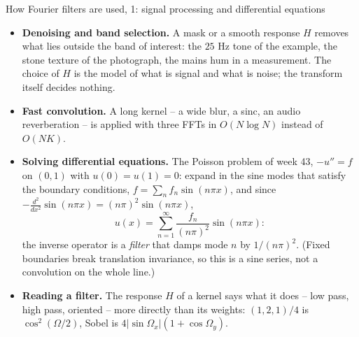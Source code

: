 \documentclass[10pt,aspectratio=169]{beamer}
\begin{document}
\begin{frame}{How Fourier filters are used, 1: signal processing and differential equations}
\small
\begin{itemize}
  \item \textbf{Denoising and band selection.}  A mask or a smooth response
        $H$ removes what lies outside the band of interest: the $25$ Hz
        tone of the example, the stone texture of the photograph, the
        mains hum in a measurement.  The choice of $H$ is the model of
        what is signal and what is noise; the transform itself decides
        nothing.
  \item \textbf{Fast convolution.}  A long kernel -- a wide blur, a sinc, an
        audio reverberation -- is applied with three FFTs in $O(N\log N)$
        instead of $O(NK)$.
  \item \textbf{Solving differential equations.}  The Poisson problem of
        week 43, $-u''=f$ on $(0,1)$ with $u(0)=u(1)=0$: expand in the
        sine modes that satisfy the boundary conditions,
        $f=\sum_nf_n\sin(n\pi x)$, and since
        $-\frac{d^{2}}{dx^{2}}\sin(n\pi x)=(n\pi)^{2}\sin(n\pi x)$,
        \[
          u(x)=\sum_{n=1}^{\infty}\frac{f_n}{(n\pi)^{2}}\sin(n\pi x):
        \]
        the inverse operator is a \emph{filter} that damps mode $n$ by
        $1/(n\pi)^{2}$.  (Fixed boundaries break translation invariance,
        so this is a sine series, not a convolution on the whole line.)
  \item \textbf{Reading a filter.}  The response $H$ of a kernel says what
        it does -- low pass, high pass, oriented -- more directly than its
        weights: $(1,2,1)/4$ is $\cos^{2}(\Omega/2)$, Sobel is
        $4|\sin\Omega_x|(1+\cos\Omega_y)$.
\end{itemize}
\end{frame}
\end{document}
